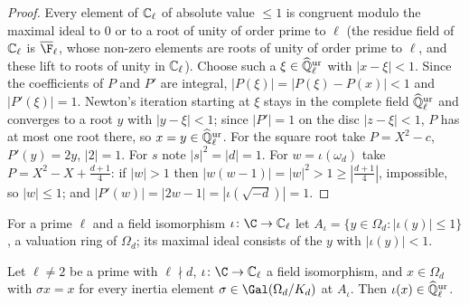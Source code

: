 \begin{proof}
Every element of $\mathbb{C}_\ell$ of absolute value $\le1$ is congruent modulo the maximal ideal to $0$ or to a root of
unity of order prime to $\ell$ (the residue field of $\mathbb{C}_\ell$ is $\overline{\F}_\ell$, whose non-zero elements
are roots of unity of order prime to $\ell$, and these lift to roots of unity in $\mathbb{C}_\ell$). Choose such a $\xi\in\widehat{\mathbb{Q}}{}_\ell^{\mathrm{ur}}$ with $|x-\xi|<1$.
Since the coefficients of $P$ and $P'$ are integral, $|P(\xi)|=|P(\xi)-P(x)|<1$ and $|P'(\xi)|=1$. Newton's
iteration starting at $\xi$ stays in the complete field $\widehat{\mathbb{Q}}{}_\ell^{\mathrm{ur}}$ and converges to a root $y$ with $|y-\xi|<1$;
since $|P'|=1$ on the disc $|z-\xi|<1$, $P$ has at most one root there, so $x=y\in\widehat{\mathbb{Q}}{}_\ell^{\mathrm{ur}}$. For the square root
take $P=X^2-c$, $P'(y)=2y$, $|2|=1$. For $s$ note $|s|^2=|d|=1$. For $w=\iota(\omega_d)$ take
$P=X^2-X+\tfrac{d+1}{4}$: if $|w|>1$ then $|w(w-1)|=|w|^2>1\ge|\tfrac{d+1}4|$, impossible, so $|w|\le1$; and
$|P'(w)|=|2w-1|=|\iota(\sqrt{-d})|=1$.
\end{proof}

For a prime $\ell$ and a field isomorphism $\iota\colon\C\to\reckCl$ let $A_\iota=\{y\in\Omega_d:|\iota(y)|\le1\}$, a
valuation ring of $\Omega_d$; its maximal ideal consists of the $y$ with $|\iota(y)|<1$.

\begin{lemma}\label{pf:reckernel:inertKur}
Let $\ell\ne2$ be a prime with $\ell\nmid d$, $\iota\colon\C\to\reckCl$ a field isomorphism, and $x\in\Omega_d$ with
$\sigma x=x$ for every inertia element $\sigma\in\Gal(\Omega_d/K_d)$ at $A_\iota$. Then $\iota(x)\in\widehat{\mathbb{Q}}{}_\ell^{\mathrm{ur}}$.
\end{lemma}

